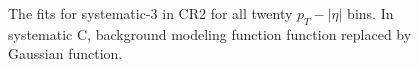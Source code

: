 \begin{figure}[H]
\begin{center}
\scalebox{0.35}{}\scalebox{0.35}{}
\scalebox{0.35}{}\scalebox{0.35}{}
\caption{The fits for systematic-3 in CR2 for all twenty $p_T-|\eta|$ bins. In systematic C, background modeling function function replaced by Gaussian function.}
\label{fig:fit_cr2_sys3}
\end{center}
\end{figure}
